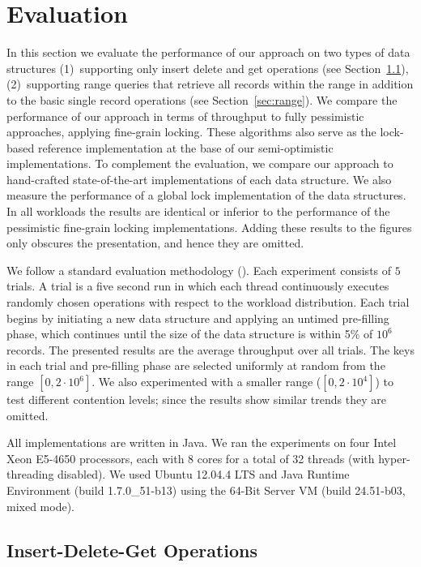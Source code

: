 \section{Evaluation}
\label{sec:eval}

In this section we evaluate the performance of our approach on two types of data
structures (1)~supporting only insert delete and get operations (see
Section~\ref{sec:readwrite}), (2)~supporting range queries that retrieve all
records within the range in addition to the basic single record operations (see
Section~\ref{sec:range}). We compare the performance of our approach in terms of
throughput to fully pessimistic approaches, applying fine-grain locking. These
algorithms also serve as the lock-based reference implementation at the base of
our semi-optimistic implementations. 
To complement the evaluation, we 
compare our approach to hand-crafted state-of-the-art implementations of each
data structure. 
We also measure the performance of a global lock implementation of the data
structures. In all workloads the results are identical or inferior to the
performance of the pessimistic fine-grain locking implementations. Adding these
results to the figures only obscures the presentation, and hence they are omitted.        

We follow a standard evaluation methodology
(\cite{DrachslerVY2014,NatarajanM2014,BrownER2014,ArbelA2014}). Each experiment
consists of $5$ trials. A trial is a five second run in which each thread continuously executes
randomly chosen operations with respect to the workload distribution. Each trial
begins by initiating a new data structure and applying an untimed pre-filling
phase, which continues until the size of the data structure is within 5\% of
$10^6$ records. The presented results are the average throughput over all trials.    
The keys in each trial and pre-filling phase are selected uniformly at random
from the range $[0,2\cdot10^6]$.
We also experimented with a smaller range ($[0,2\cdot10^4]$) to test different
contention levels; since the results show similar trends they are omitted. 

All implementations are written in Java. We ran the experiments on four Intel
Xeon E5-4650 processors, each with 8 cores for a total of 32 threads 
(with hyper-threading disabled). 
We used Ubuntu 12.04.4 LTS and Java Runtime Environment (build
1.7.0\_51-b13) using the 64-Bit Server VM (build 24.51-b03, mixed mode).

\subsection{Insert-Delete-Get Operations}
\label{sec:readwrite} 

